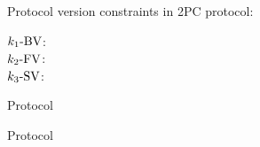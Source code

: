 \begin{frame}{\rvsimp{} Protocol}
  \rvsi{} version constraints in 2PC protocol:
  \begin{description}
    \item[$k_1\text{-BV}$:]
    \item[$k_2\text{-FV}$:]
    \item[$k_3\text{-SV}$:]
  \end{description}
\end{frame}

\begin{frame}{\rvsims{} Protocol}
  \begin{figure}[t]
    
  \end{figure}
\end{frame}

\begin{frame}{\rvsimp{} Protocol}
  \begin{figure}[t]
    
  \end{figure}
\end{frame}

\begin{frame}{}
\end{frame}
